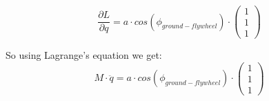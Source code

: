 \begin{equation}
	\frac{\partial L}{\partial q} = a \cdot cos(\phi_{ground-flywheel}) \cdot 	
	\begin{pmatrix}
	1 \\ 1 \\ 1
	\end{pmatrix}	
\end{equation}

So using Lagrange's equation we get:
\begin{equation}
	\boxed{
	M \cdot \ddot{q} = a \cdot cos(\phi_{ground-flywheel}) \cdot 	
	\begin{pmatrix}
	1 \\ 1 \\ 1
	\end{pmatrix}
	}
\end{equation}
